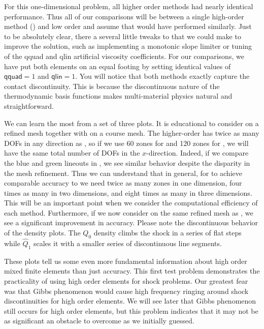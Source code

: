 For this one-dimensional problem, all higher order methods had nearly identical performance. Thus all of our comparisons will be between a single high-order method () and low order  and assume that  would have performed similarly. Just to be absolutely clear, there a several little tweaks to  that we could make to improve the solution, such as implementing a monotonic slope limiter \cite{BergerAftosmis05} or tuning of the \textsf{qquad} and \textsf{qlin} artificial viscosity coefficients. For our comparisons, we have put both elements on an equal footing by setting identical values of $\mathsf{qquad} = 1$ and $\mathsf{qlin}=1$. You will notice that both methods exactly capture the contact discontinuity. This is because the discontinuous nature of the thermodynamic basis functions makes multi-material physics natural and straightforward.

We can learn the most from a set of three plots. It is educational to consider  on a refined mesh together with  on a course mesh. The higher-order  has twice as many DOFs in any direction as , so if we use 60 zones for  and 120 zones for , we will have the same total number of DOFs in the $x$-direction. Indeed, if we compare the blue and green lineouts in , we see similar behavior despite the disparity in the mesh refinement. Thus we can understand that in general, for  to achieve comparable accuracy to  we need twice as many zones in one dimension, four times as many in two dimensions, and eight times as many in three dimensions. This will be an important point when we consider the computational efficiency of each method. Furthermore, if we now consider  on the same refined mesh as , we see a significant improvement in accuracy. Please note the discontinuous behavior of the density plots. The $Q_0$ density climbs the shock in a series of flat steps while $\hat Q_1$ scales it with a smaller series of discontinuous line segments. 

These plots tell us some even more fundamental information about high order mixed finite elements than just accuracy. This first test problem demonstrates the practicality of using high order elements for shock problems. Our greatest fear was that Gibbs phenomenon \cite{Gibbs1898} would cause high frequency ringing around shock discontinuities for high order elements. We will see later that Gibbs phenomenon still occurs for high order elements, but this problem indicates that it may not be as significant an obstacle to overcome as we initially guessed.

